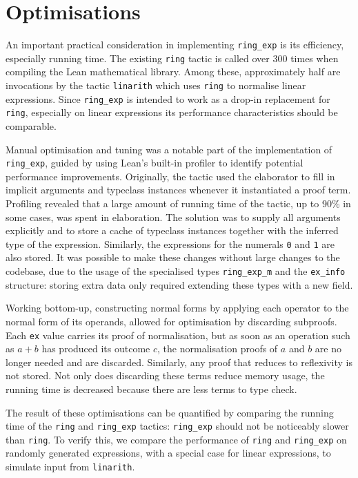 \documentclass{llncs}
\newcommand{\lean}[1]{\texttt{#1}\xspace} %
\newcommand{\ringexp}{\lean{ring\_exp}}
\begin{document}

\section{Optimisations}

An important practical consideration in implementing \ringexp is its efficiency, especially running time.
The existing \lean{ring} tactic is called over 300 times when compiling the Lean mathematical library.
Among these, approximately half are invocations by the tactic \lean{linarith} which uses \lean{ring} to normalise linear expressions.
Since \ringexp is intended to work as a drop-in replacement for \lean{ring},
especially on linear expressions its performance characteristics should be comparable.

Manual optimisation and tuning was a notable part of the implementation of \ringexp,
guided by using Lean's built-in profiler to identify potential performance improvements.
Originally, the tactic used the elaborator to fill in implicit arguments and typeclass instances
whenever it instantiated a proof term.
Profiling revealed that a large amount of running time of the tactic, up to 90\% in some cases,
was spent in elaboration.
The solution was to supply all arguments explicitly
and to store a cache of typeclass instances together with the inferred type of the expression.
Similarly, the expressions for the numerals \lean{0} and \lean{1} are also stored.
It was possible to make these changes without large changes to the codebase,
due to the usage of the specialised types \lean{ring\_exp\_m} and the \lean{ex\_info} structure:
storing extra data only required extending these types with a new field.

Working bottom-up, constructing normal forms by applying each operator to the normal form of its operands,
allowed for optimisation by discarding subproofs.
Each \lean{ex} value carries its proof of normalisation,
but as soon as an operation such as $a + b$ has produced its outcome $c$,
the normalisation proofs of $a$ and $b$ are no longer needed and are discarded.
Similarly, any proof that reduces to reflexivity is not stored.
Not only does discarding these terms reduce memory usage,
the running time is decreased because there are less terms to type check.

The result of these optimisations can be quantified by comparing the running time
of the \lean{ring} and \ringexp tactics: \ringexp should not be noticeably slower than \lean{ring}.
To verify this, we compare the performance of \lean{ring} and \ringexp on randomly generated expressions,
with a special case for linear expressions, to simulate input from \lean{linarith}.
\end{document}

